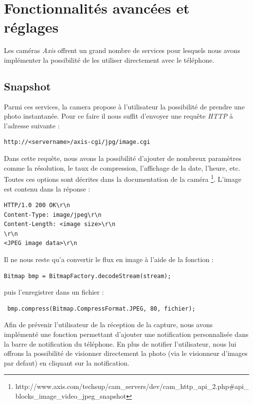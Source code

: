 \section{Fonctionnalités avancées et réglages}
Les caméras \textit{Axis} offrent un grand nombre de services pour lesquels
nous avons implémenter la possibilité de les utiliser directement avec le
téléphone.
\subsection{Snapshot}
Parmi ces services, la camera propose à l'utilisateur la possibilité de
prendre une photo instantanée. \newline
Pour ce faire il nous suffit d'envoyer une requête \textit{HTTP} à l'adresse
suivante : 
\begin{lstlisting}
http://<servername>/axis-cgi/jpg/image.cgi
\end{lstlisting}
Dans cette requête, nous avons la possibilité d'ajouter de nombreux paramètres
comme la résolution, le taux de compression, l'affichage de la date, l'heure,
etc. Toutes ces options sont décrites dans la documentation de la caméra
\footnote{\label{MjpegView}http://www.axis.com/techsup/cam\_servers/dev/cam\_http\_api\_2.php\#api\_blocks\_image\_video\_jpeg\_snapshot}.
L'image est contenu dans la réponse :
\begin{lstlisting}
HTTP/1.0 200 OK\r\n
Content-Type: image/jpeg\r\n
Content-Length: <image size>\r\n
\r\n
<JPEG image data>\r\n
\end{lstlisting}
Il ne nous reste qu'a convertir le flux en image
à l'aide de la fonction :
\begin{lstlisting}
Bitmap bmp = BitmapFactory.decodeStream(stream);
\end{lstlisting}
puis l'enregistrer dans un fichier :
\begin{lstlisting}
 bmp.compress(Bitmap.CompressFormat.JPEG, 80, fichier);
\end{lstlisting}
Afin de prévenir l'utilisateur de la réception de la capture, nous avons
implémenté une fonction permettant d'ajouter une notification personnalisée dans
la barre de notification du téléphone.\newline
En plus de notifier l'utilisateur, nous lui offrons la possibilité de visionner directement la photo (via le visionneur d'images par defaut) en cliquant sur la notification.
